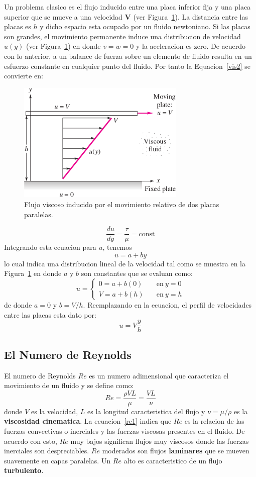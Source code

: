 \documentclass[10pt, oneside]{article}
\begin{document}
Un problema  clasico es el flujo inducido entre una placa inferior fija y una placa superior que se mueve a una velocidad $\mathbf{V}$ (ver Figura~\ref{pla}). La distancia entre las placas es $h$ y dicho espacio esta ocupado por un fluido newtoniano. Si las placas son grandes, el movimiento permanente induce una distribucion de velocidad $u(y)$  (ver Figura~\ref{pla}) en donde $v=w=0$ y la aceleracion es zero. De acuerdo con lo anterior, a un balance de fuerza sobre un elemento de fluido resulta en un esfuerzo constante en cualquier punto del fluido. Por tanto la Equacion~\ref{vis2} se convierte en:

\begin{figure}[h]
\centering
\includegraphics[width=8cm]{plate}
\caption{Flujo viscoso inducido por el movimiento relativo de dos placas paralelas.}
\label{pla}
\end{figure}

$$
\frac{du}{dy}=\frac{\tau}{\mu}=\text{const}
$$
Integrando esta ecuacion para $u$, tenemos
$$
u=a+by
$$
lo cual indica una distribucion lineal de la velocidad tal como se muestra en la Figura~\ref{pla} en donde $a$ y $b$ son constantes que se evaluan como:
$$
u= 
\begin{cases}
0 = a+b(0) & \quad \text{en}\ y=0 \\
V = a+b(h) & \quad \text{en}\ y=h 
\end{cases}
$$
de donde $a=0$ y $b=V/h$. Reemplazando en la ecuacion, el perfil de velocidades entre las placas esta dato por:
\begin{equation}
u=V\frac{y}{h}
\label{upl}
\end{equation}


\subsection{El Numero de Reynolds}
El numero de Reynolds $Re$ es un numero adimensional que caracteriza el movimiento de un fluido y se define como:
\begin{equation}
Re=\frac{\rho VL}{\mu}=\frac{VL}{\nu}
\label{re1}
\end{equation}
donde $V$ es la velocidad, $L$ es la longitud caracteristica del flujo y $\nu=\mu/\rho$  es la \textbf{viscosidad cinematica}. La ecuacion~\ref{re1} indica que $Re$ es la relacion de las fuerzas convectivas o inerciales y las fuerzas viscosas presentes en el fluido. De acuerdo con esto, $Re$ muy bajos significan flujos muy viscosos donde las fuerzas inerciales son despreciables. $Re$ moderados son flujos \textbf{laminares} que se mueven suavemente en capas paralelas. Un $Re$ alto es caracteristico de un flujo \textbf{turbulento}.  
\end{document}
